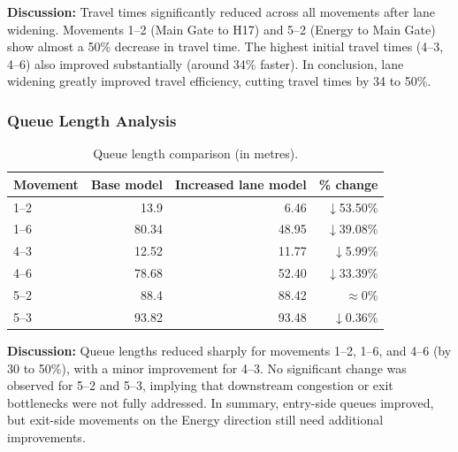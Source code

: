\documentclass[11pt]{article}
\begin{document}
\textbf{Discussion:} Travel times significantly reduced across all movements after lane widening.
Movements 1--2 (Main Gate to H17) and 5--2 (Energy to Main Gate) show almost a 50\% decrease in travel
time. The highest initial travel times (4--3, 4--6) also improved substantially (around 34\% faster).
In conclusion, lane widening greatly improved travel efficiency, cutting travel times by 34 to 50\%.

\subsubsection{Queue Length Analysis}
\begin{table}[H]
  \centering
  \small
  \caption{Queue length comparison (in metres).}
  \begin{tabular}{@{}lrrr@{}}
    \toprule
    \textbf{Movement} & \textbf{Base model} & \textbf{Increased lane model} & \textbf{\% change} \\
    \midrule
    1--2 & 13.9  & 6.46  & $\downarrow$53.50\% \\
    1--6 & 80.34 & 48.95 & $\downarrow$39.08\% \\
    4--3 & 12.52 & 11.77 & $\downarrow$5.99\%  \\
    4--6 & 78.68 & 52.40 & $\downarrow$33.39\% \\
    5--2 & 88.4  & 88.42 & $\approx$0\% \\
    5--3 & 93.82 & 93.48 & $\downarrow$0.36\% \\
    \bottomrule
  \end{tabular}
\end{table}

\textbf{Discussion:} Queue lengths reduced sharply for movements 1--2, 1--6, and 4--6 (by 30 to 50\%),
with a minor improvement for 4--3. No significant change was observed for 5--2 and 5--3, implying that
downstream congestion or exit bottlenecks were not fully addressed. In summary, entry-side queues
improved, but exit-side movements on the Energy direction still need additional improvements.
\end{document}
